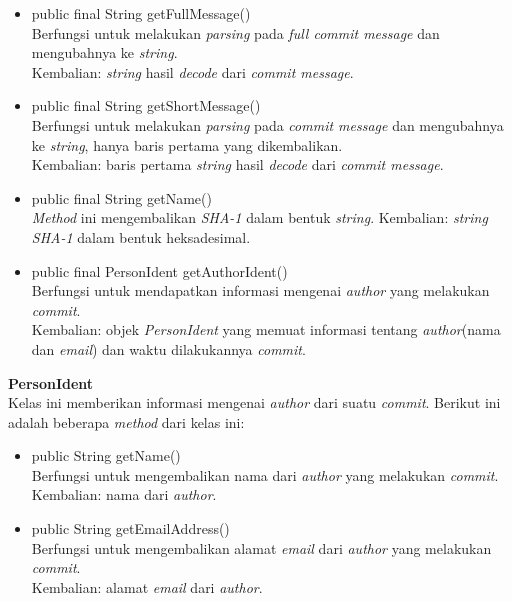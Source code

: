 \documentclass[a4paper,twoside]{article}
\begin{document}
\begin{enumerate}
\begin{itemize}
\item public final String getFullMessage()\\
Berfungsi untuk melakukan \textit{parsing} pada \textit{full commit message} dan mengubahnya ke \textit{string}.\\
Kembalian: \textit{string} hasil \textit{decode} dari \textit{commit message}.

\item public final String getShortMessage()\\
Berfungsi untuk melakukan \textit{parsing} pada \textit{commit message} dan mengubahnya ke \textit{string}, hanya baris pertama yang dikembalikan.\\
Kembalian: baris pertama \textit{string} hasil \textit{decode} dari \textit{commit message}.

\item public final String getName()\\
\textit{Method} ini mengembalikan \textit{SHA-1} dalam bentuk \textit{string}.
Kembalian: \textit{string SHA-1} dalam bentuk heksadesimal. 

\item public final PersonIdent getAuthorIdent()\\
Berfungsi untuk mendapatkan informasi mengenai \textit{author} yang melakukan \textit{commit}.\\
Kembalian: objek \textit{PersonIdent} yang memuat informasi tentang \textit{author}(nama dan \textit{email}) dan waktu dilakukannya \textit{commit}.
\end{itemize}

\textbf{PersonIdent}\\
Kelas ini memberikan informasi mengenai \textit{author} dari suatu \textit{commit}. Berikut ini adalah beberapa \textit{method} dari kelas ini:
\begin{itemize}
\item public String getName()\\
Berfungsi untuk mengembalikan nama dari \textit{author} yang melakukan \textit{commit}.\\
Kembalian: nama dari \textit{author}.

\item public String getEmailAddress()\\
Berfungsi untuk mengembalikan alamat \textit{email} dari \textit{author} yang melakukan \textit{commit}.\\
Kembalian: alamat \textit{email} dari \textit{author}.


\end{itemize}
\end{enumerate}
\end{document}
